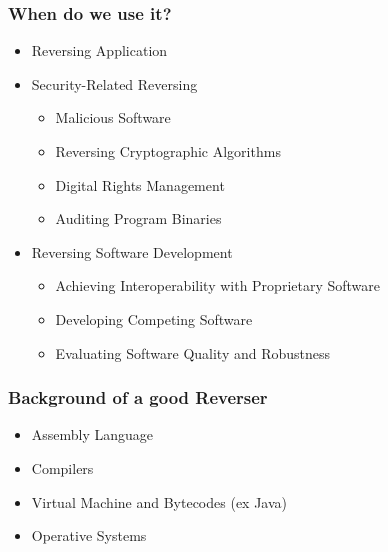 \documentclass[]{beamer}
\begin{document}
		\begin{frame}
			\frametitle{When do we use it?}
			\begin{itemize}
				\item{Reversing Application}
				\item{Security-Related Reversing}
					\begin{itemize}
						\item{Malicious Software}
						\item{Reversing Cryptographic Algorithms}
						\item{Digital Rights Management}
						\item{Auditing Program Binaries}
					\end{itemize}
				\item{Reversing Software Development}
					\begin{itemize}
						\item{Achieving Interoperability with Proprietary Software}
						\item{Developing Competing Software}
						\item{Evaluating Software Quality and Robustness}
					\end{itemize}
			\end{itemize}			
		\end{frame}
		\begin{frame}
			\frametitle{Background of a good Reverser}
			\begin{itemize}
				\item{Assembly Language}
				\item{Compilers}
				\item{Virtual Machine and Bytecodes (ex Java)}
				\item{Operative Systems}
			\end{itemize}
		\end{frame}
\end{document}
